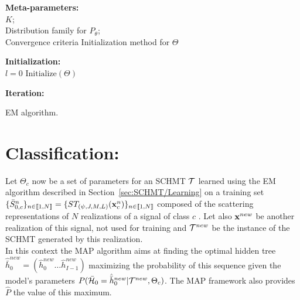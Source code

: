 \documentclass[a4paper,11pt]{report}
\begin{document}
			\begin{center}
				\begin{algorithm}
					\textbf{Meta-parameters:}\\
						$K$;\\
						Distribution family for $P_{\theta}$;\\
						Convergence criteria 
						Initialization method for $\Theta$ 
						
					\textbf{Initialization:}\\
						$l=0$ 
						$\text{Initialize}(\Theta)$
					
					\textbf{Iteration:}\\
					\caption{EM algorithm.}
					\label{algo:EM}
				\end{algorithm}        
			\end{center}
			    
  \section{Classification:}
    \label{sec:SCHMT/Clf}
    
    Let $\Theta_{c}$ now be a set of parameters for an SCHMT $\mathcal{T}$ learned using the EM algorithm described in Section~\ref{sec:SCHMT/Learning} on a training set $\{\bar{S}_{0,c}^n\}_{n \in \llbracket1, N \rrbracket} = \{ST_{(\psi, J, M, L)}({\bf x}_{c}^{n})\}_{n \in \llbracket1, N \rrbracket}$ composed of the scattering representations of $N$ realizations of a signal of class $c$ . Let also ${\bf x}^{new}$ be another realization of this signal, not used for training and $\mathcal{T}^{new}$ be the instance of the SCHMT generated by this realization.\\
    
    In this context the MAP algorithm aims at finding the optimal hidden tree $\hat{\bar{h}}_{0}^{new}=(\hat{h}_{0}^{new} \dots \hat{h}_{I-1}^{new})$ maximizing the probability of this sequence given the model's parameters $P(\bar{\mathcal{H}}_{0}= \hat{\bar{h}}_{0}^{new}|\mathcal{T}^{new},\Theta_{c})$. The MAP framework also provides $\hat{P}$ the value of this maximum.\\
    
\end{document}
